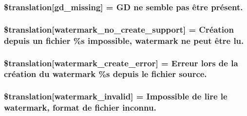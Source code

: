 \subsubsection[{\$translation}]{\setlength{\rightskip}{0pt plus 5cm}\$translation\mbox{[}\textquotesingle{}gd\+\_\+missing\textquotesingle{}\mbox{]} = \textquotesingle{}G\+D ne semble pas être présent.\textquotesingle{}}\label{class_8upload_8fr___f_r_8php_a7f3dfcc0db4bbc0f2e7210c439798e56}
\hypertarget{class_8upload_8fr___f_r_8php_a82d5853430ab72dc1f9799ec36144cc6}{}
\subsubsection[{\$translation}]{\setlength{\rightskip}{0pt plus 5cm}\$translation\mbox{[}\textquotesingle{}watermark\+\_\+no\+\_\+create\+\_\+support\textquotesingle{}\mbox{]} = \textquotesingle{}Création depuis un fichier \%s impossible, watermark ne peut être lu.\textquotesingle{}}\label{class_8upload_8fr___f_r_8php_a82d5853430ab72dc1f9799ec36144cc6}
\hypertarget{class_8upload_8fr___f_r_8php_aabca0b65dadbc6184415c16375f284ca}{}
\subsubsection[{\$translation}]{\setlength{\rightskip}{0pt plus 5cm}\$translation\mbox{[}\textquotesingle{}watermark\+\_\+create\+\_\+error\textquotesingle{}\mbox{]} = \textquotesingle{}Erreur lors de la création du watermark \%s depuis le fichier source.\textquotesingle{}}\label{class_8upload_8fr___f_r_8php_aabca0b65dadbc6184415c16375f284ca}
\hypertarget{class_8upload_8fr___f_r_8php_ac336e7a5701e47ba4a05e9e498a3cc44}{}
\subsubsection[{\$translation}]{\setlength{\rightskip}{0pt plus 5cm}\$translation\mbox{[}\textquotesingle{}watermark\+\_\+invalid\textquotesingle{}\mbox{]} = \textquotesingle{}Impossible de lire le watermark, format de fichier inconnu.\textquotesingle{}}\label{class_8upload_8fr___f_r_8php_ac336e7a5701e47ba4a05e9e498a3cc44}
\hypertarget{class_8upload_8fr___f_r_8php_a1ecb4673e4fb69e06b3f20b65cecf30a}{}
